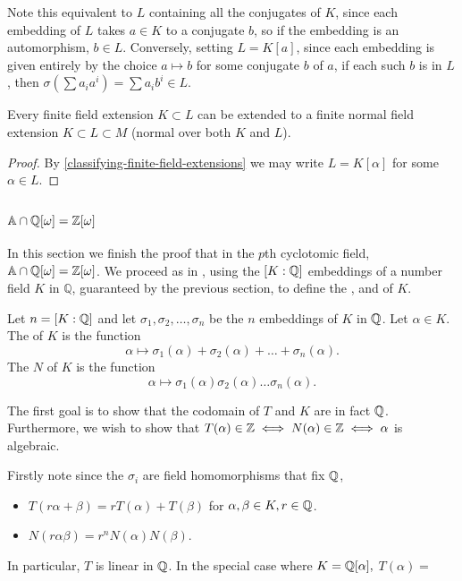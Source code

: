 Note this equivalent to $L$ containing all the conjugates of $K$, since each embedding of $L$ takes $a \in K$ to a conjugate $b$, so if the embedding is an automorphism, $b\in L$. Conversely, setting $L=K[a]$, since each embedding is given entirely by the choice $a\mapsto b$ for some conjugate $b$ of $a$, if each such $b$ is in $L$, then $\sigma(\sum a_i a^i)=\sum a_i b^i\in L$.

\begin{theorem}
Every finite field extension $K\subset L$ can be extended to a finite normal field extension $K\subset L \subset M$ (normal over both $K$ and $L$).
\end{theorem}
\begin{proof}
By \cref{classifying-finite-field-extensions} we may write $L=K[\alpha]$ for some $\alpha \in L$. 
\end{proof}

\subsection{$\mathbb{A}\cap\mathbb{Q}[\omega]= \mathbb{Z}[\omega]$}
In this section we finish the proof that in the $p$th cyclotomic field, $\mathbb{A}\cap\mathbb{Q}[\omega]= \mathbb{Z}[\omega]$. We proceed as in \cite{NumberFields}, using the $[K:\mathbb{Q}]$ embeddings of a number field $K$ in $\mathbb{Q}$, guaranteed by the previous section, to define the ,  and  of $K$. 

\begin{definition}
Let $n=[K:\mathbb{Q}]$ and let $\sigma_1,\sigma_2,\dots,\sigma_n$ be the $n$ embeddings of $K$ in $\mathbb{Q}$. Let $\alpha\in K$. The  of $K$  is the function $$\alpha\mapsto\sigma_1(\alpha)+\sigma_2(\alpha)+\dots+\sigma_n(\alpha).$$
The  $N$ of $K$ is the function
$$\alpha\mapsto\sigma_1(\alpha)\sigma_2(\alpha)\dots \sigma_n(\alpha).$$
\end{definition}

The first goal is to show that the codomain of $T$ and $K$ are in fact $\mathbb{Q}$. Furthermore, we wish to show that  $T(\alpha)\in \mathbb{Z}\iff N(\alpha)\in \mathbb{Z}\iff \alpha$ is algebraic. 

Firstly note since the $\sigma_i$ are field homomorphisms that fix $\mathbb{Q}$,

\begin{itemize}
    \item $T(r\alpha+\beta)=rT(\alpha)+T(\beta)$ for $\alpha,\beta\in K, r\in \mathbb{Q}$.
    \item $N(r\alpha\beta)=r^nN(\alpha)N(\beta)$.
\end{itemize}
In particular, $T$ is linear in $\mathbb{Q}$. In the special case where $K=\mathbb{Q}[\alpha],$ $T(\alpha)=$

